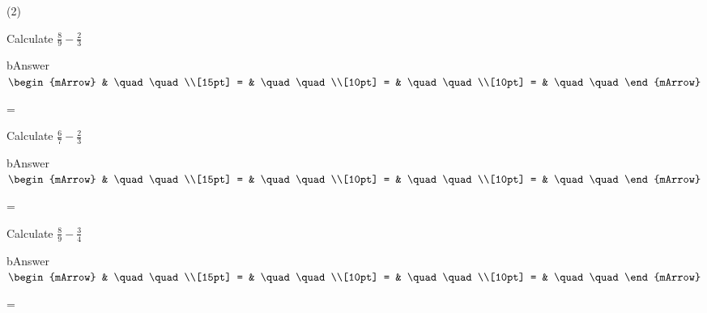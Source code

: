 \clearpage\noindent%
\begin{mtask}(2)
   \task \begin{exercise} Calculate $ \frac{8}{9} - \frac{2}{3} $
           \begin{envOut}{bAnswer}
             $\begin{mArrow} 
			       & \quad \quad              \\[15pt]
                 = & \quad \quad              \\[10pt]
		   		 = & \quad \quad              \\[10pt]
				 = & \quad \quad 
              \end{mArrow}$
            \begin{shortsolution}  
			     =$ \quad \quad \quad \quad$
			\end{shortsolution}				 
           \end{envOut}
         \end{exercise}

   \task \begin{exercise} Calculate $ \frac{6}{7} - \frac{2}{3} $
           \begin{envOut}{bAnswer}
             $\begin{mArrow} 
			       & \quad \quad              \\[15pt]
                 = & \quad \quad              \\[10pt]
		   		 = & \quad \quad              \\[10pt]
				 = & \quad \quad 
              \end{mArrow}$
            \begin{shortsolution}  
			     =$ \quad \quad \quad \quad$
			\end{shortsolution}				 
           \end{envOut}
         \end{exercise}


   \task \begin{exercise} Calculate $ \frac{8}{9} - \frac{3}{4} $
           \begin{envOut}{bAnswer}
             $\begin{mArrow} 
			       & \quad \quad              \\[15pt]
                 = & \quad \quad              \\[10pt]
		   		 = & \quad \quad              \\[10pt]
				 = & \quad \quad 
              \end{mArrow}$
            \begin{shortsolution}  
			     =$ \quad \quad \quad \quad$
			\end{shortsolution}				 
           \end{envOut}
         \end{exercise}
		 


\end{mtask}
